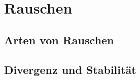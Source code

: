 %
%
%
%


\section{Rauschen\label{brown:Rauschen}}


\subsection{Arten von Rauschen\label{brown:Rauschen:Definition}}


\subsection{Divergenz und Stabilität\label{brown:Rauschen:Stabilität}}


